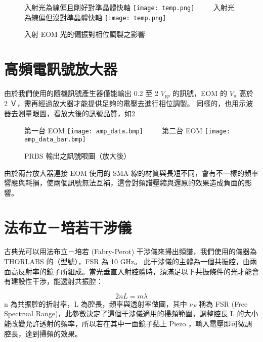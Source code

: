 \documentclass[class=NCU_thesis, crop=false]{standalone}
\begin{document}
\begin{figure}[!hbt]
    \centering
    \subcaptionbox
        {入射光為線偏且剛好對準晶體快軸
        \label{fig:perfect_polarization}}
        {\texttt{[image: temp.png]}}
    ~~~~
    \subcaptionbox
        {入射光為線偏但沒對準晶體快軸
        \label{fig:imperfect_polarization}}
        {\texttt{[image: temp.png]}}
    \caption{入射 EOM 光的偏振對相位調製之影響}
    \label{fig:prbs_eye}
\end{figure}

\section{高頻電訊號放大器}
由於我們使用的隨機訊號產生器僅能輸出 0.2 至 2 $V_{pp}$ 的訊號，EOM 的 $V_{\pi}$ 高於 2 Ｖ，需再經過放大器才能提供足夠的電壓去進行相位調製。
同樣的，也用示波器去測量眼圖，看放大後的訊號品質，如\cref{fig:amp_prbs_eye}

\begin{figure}[!hbt]
    \centering
    \subcaptionbox
        {第一台 EOM
        \label{fig:subfig_fig1}}
        {\texttt{[image: amp\_data.bmp]}}
    ~~~~
    \subcaptionbox
        {第二台 EOM
        \label{fig:subfig_fig2}}
        {\texttt{[image: amp\_data\_bar.bmp]}}
    \caption{PRBS 輸出之訊號眼圖（放大後）}
    \label{fig:amp_prbs_eye}
\end{figure}

由於兩台放大器連接 EOM 使用的 SMA 線的材質與長短不同，會有不一樣的頻率響應與耗損，使兩個訊號無法互補，這會對頻譜壓縮與還原的效果造成負面的影響。

\section{法布立－培若干涉儀}
古典光可以用法布立－培若 (Fabry-Perot) 干涉儀來掃出頻譜，我們使用的儀器為 THORLABS 的（型號），FSR 為 10 GHz。
此干涉儀的主體為一個共振腔，由兩面高反射率的鏡子所組成。當光垂直入射腔體時，須滿足以下共振條件的光才能會有建設性干涉，能透射共振腔：

\begin{equation}
    2nL=m\lambda
\end{equation}
n 為共振腔的折射率，L 為腔長，頻率與透射率做圖，其中 $\nu_{F}$ 稱為 FSR (Free Spectrual Range)，此參數決定了這個干涉儀適用的掃頻範圍，調整腔長 L 的大小能改變允許透射的頻率，所以若在其中一面鏡子黏上 Piezo ，輸入電壓即可微調腔長，達到掃頻的效果。
\end{document}
